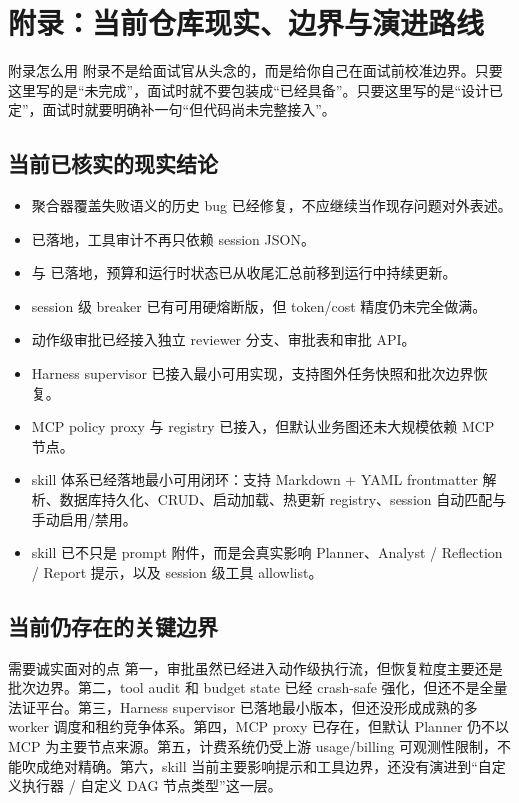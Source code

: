 \documentclass[12pt]{article}
\begin{document}



\section{附录：当前仓库现实、边界与演进路线}

\begin{summaryBox}{附录怎么用}
附录不是给面试官从头念的，而是给你自己在面试前校准边界。只要这里写的是“未完成”，面试时就不要包装成“已经具备”。只要这里写的是“设计已定”，面试时就要明确补一句“但代码尚未完整接入”。
\end{summaryBox}

\subsection{当前已核实的现实结论}
\begin{itemize}[leftmargin=2em]
  \item 聚合器覆盖失败语义的历史 bug 已经修复，不应继续当作现存问题对外表述。
  \item {} 已落地，工具审计不再只依赖 session JSON。
  \item {} 与  已落地，预算和运行时状态已从收尾汇总前移到运行中持续更新。
  \item session 级 breaker 已有可用硬熔断版，但 token/cost 精度仍未完全做满。
  \item 动作级审批已经接入独立 reviewer 分支、审批表和审批 API。
  \item Harness supervisor 已接入最小可用实现，支持图外任务快照和批次边界恢复。
  \item MCP policy proxy 与 registry 已接入，但默认业务图还未大规模依赖 MCP 节点。
  \item skill 体系已经落地最小可用闭环：支持 Markdown + YAML frontmatter 解析、数据库持久化、CRUD、启动加载、热更新 registry、session 自动匹配与手动启用/禁用。
  \item skill 已不只是 prompt 附件，而是会真实影响 Planner、Analyst / Reflection / Report 提示，以及 session 级工具 allowlist。
\end{itemize}

\subsection{当前仍存在的关键边界}
\begin{riskBox}{需要诚实面对的点}
第一，审批虽然已经进入动作级执行流，但恢复粒度主要还是批次边界。第二，tool audit 和 budget state 已经 crash-safe 强化，但还不是全量法证平台。第三，Harness supervisor 已落地最小版本，但还没形成成熟的多 worker 调度和租约竞争体系。第四，MCP proxy 已存在，但默认 Planner 仍不以 MCP 为主要节点来源。第五，计费系统仍受上游 usage/billing 可观测性限制，不能吹成绝对精确。第六，skill 当前主要影响提示和工具边界，还没有演进到“自定义执行器 / 自定义 DAG 节点类型”这一层。
\end{riskBox}
\end{document}
